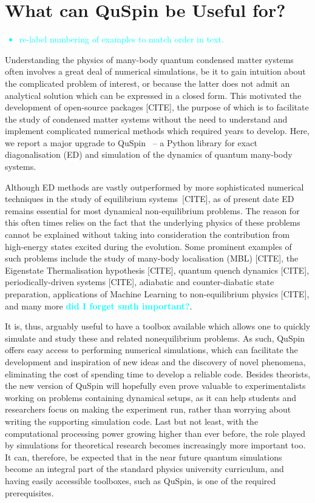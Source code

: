 \documentclass{SciPost}
\newcommand\0{\scalebox{-1}[1]{0}}
\newcommand*{\cyan}{\textcolor{cyan}}
\begin{document}
\section{What can QuSpin be Useful for?}
\label{sec:intro}

\cyan{
\begin{itemize}
	\item re-label numbering of examples to match order in text.
\end{itemize}
	}

Understanding the physics of many-body quantum condensed matter systems often involves a great deal of numerical simulations, be it to gain intuition about the complicated problem of interest, or because the latter does not admit an analytical solution which can be expressed in a closed form. This motivated the development of open-source packages [CITE], the purpose of which is to facilitate the study of condensed matter systems without the need to understand and implement complicated numerical methods which required years to develop. Here, we report a major upgrade to QuSpin~\cite{weinberg_17_quspin} -- a Python library for exact diagonalisation (ED) and simulation of the dynamics of quantum many-body systems. 

Although ED methods are vastly outperformed by more sophisticated numerical techniques in the study of equilibrium systems~[CITE], as of present date ED remains essential for most dynamical non-equilibrium problems. The reason for this often times relies on the fact that the underlying physics of these problems cannot be explained without taking into consideration the contribution from high-energy states excited during the evolution. Some prominent examples of such problems include the study of many-body localisation (MBL) [CITE], the Eigenstate Thermalisation hypothesis [CITE], quantum quench dynamics [CITE], periodically-driven systems [CITE], adiabatic and counter-diabatic state preparation, applications of Machine Learning to non-equilibrium physics [CITE], and many more \cyan{\bf did I forget smth important?}.

It is, thus, arguably useful to have a toolbox available which allows one to quickly simulate and study these and related nonequilibrium problems. As such, QuSpin offers easy access to performing numerical simulations, which can facilitate the development and inspiration of new ideas and the discovery of novel phenomena, eliminating the cost of spending time to develop a reliable code. Besides theorists, the new version of QuSpin will hopefully even prove valuable to experimentalists working on problems containing dynamical setups, as it can help students and researchers focus on making the experiment run, rather than worrying about writing the supporting simulation code. Last but not least, with the computational processing power growing higher than ever before, the role played by simulations for theoretical research becomes increasingly more important too. It can, therefore, be expected that in the near future quantum simulations become an integral part of the standard physics university curriculum, and having easily accessible toolboxes, such as QuSpin, is one of the required prerequisites.
\end{document}
